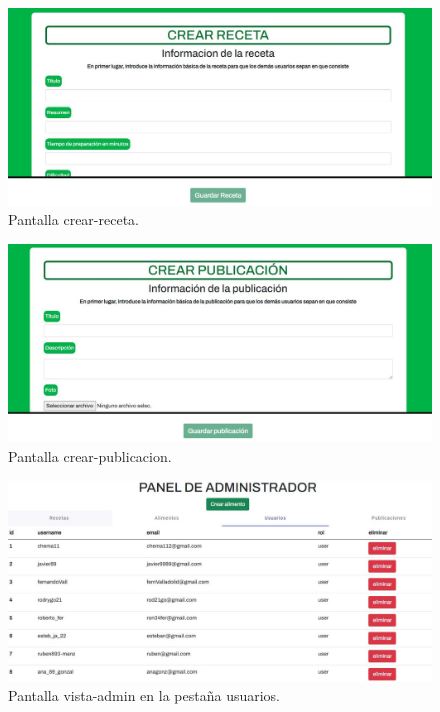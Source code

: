 \begin{figure}
  \centering
  \includegraphics[scale=0.30]{img/ma-crear-receta.JPG}
  \caption{Pantalla crear-receta.}
  \label{fig:ma-crear-receta}
\end{figure}

\begin{figure}
  \centering
  \includegraphics[scale=0.30]{img/ma-crear-publicacion.JPG}
  \caption{Pantalla crear-publicacion.}
  \label{fig:ma-crear-publicacion}
\end{figure}

\begin{figure}
  \centering
  \includegraphics[scale=0.30]{img/ma-usuarios-admin.JPG}
  \caption{Pantalla vista-admin en la pestaña usuarios.}
  \label{fig:ma-usuarios-admin}
\end{figure}

